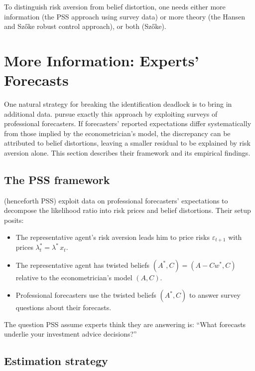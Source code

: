 \documentclass[12pt]{article}
\theoremstyle{definition}
\begin{document}
To distinguish risk aversion from belief distortion, one needs either
more information (the PSS approach using survey data) or more theory
(the Hansen and Sz\H{o}ke robust control approach), or both (Sz\H{o}ke).


\section{More Information: Experts' Forecasts}
\label{sec:PSS}

One natural strategy for breaking the identification deadlock is to
bring in additional data.  \citet{PSS2015}
pursue exactly this approach by exploiting surveys of professional
forecasters.  If forecasters' reported expectations differ
systematically from those implied by the econometrician's model, the
discrepancy can be attributed to belief distortions, leaving a smaller
residual to be explained by risk aversion alone.  This section describes
their framework and its empirical findings.

\subsection{The PSS framework}

\citet{PSS2015} (henceforth PSS) exploit data on
professional forecasters' expectations to decompose the likelihood ratio
into risk prices and belief distortions.  Their setup posits:
\begin{itemize}
\item The representative agent's risk aversion leads him to price risks
      $\varepsilon_{t+1}$ with prices $\lambda_t^* = \lambda^*\, x_t$.
\item The representative agent has twisted beliefs
      $(A^*, C) = (A - C w^*, C)$ relative to the econometrician's model
      $(A, C)$.
\item Professional forecasters use the twisted beliefs $(A^*, C)$ to
      answer survey questions about their forecasts.
\end{itemize}

The question PSS assume experts think they are answering is: ``What
forecasts underlie your investment advice decisions?''

\subsection{Estimation strategy}
\end{document}
